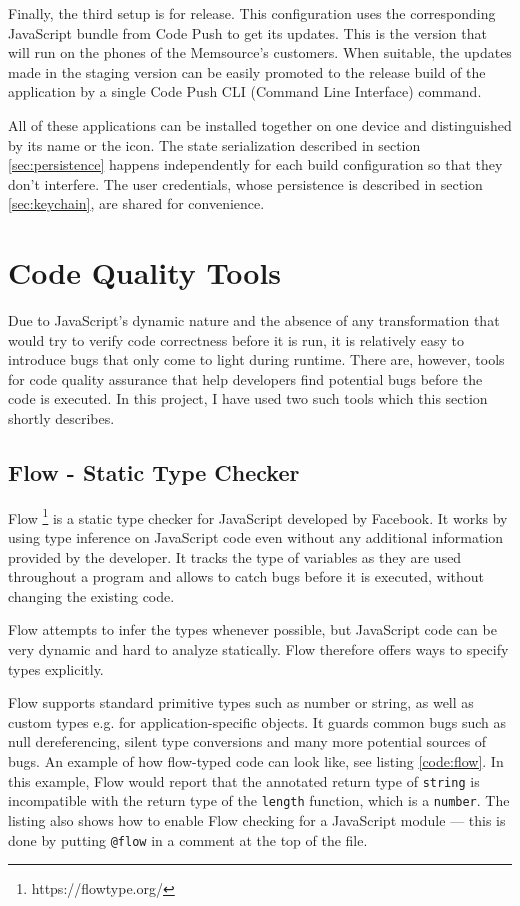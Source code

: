 Finally, the third setup is for release. This configuration uses the corresponding JavaScript bundle from Code Push to get its updates. This is the version that will run on the phones of the Memsource’s customers. When suitable, the updates made in the staging version can be easily promoted to the release build of the application by a single Code Push CLI (Command Line Interface) command.

All of these applications can be installed together on one device and distinguished by its name or the icon. The state serialization described in section \ref{sec:persistence} happens independently for each build configuration so that they don't interfere. The user credentials, whose persistence is described in section \ref{sec:keychain}, are shared for convenience.

\section{Code Quality Tools}

Due to JavaScript's dynamic nature and the absence of any transformation that would try to verify code correctness before it is run, it is relatively easy to introduce bugs that only come to light during runtime. There are, however, tools for code quality assurance that help developers find potential bugs before the code is executed. In this project, I have used two such tools which this section shortly describes.

\subsection{Flow - Static Type Checker}

Flow \footnote{https://flowtype.org/}   is a static type checker for JavaScript developed by Facebook. It works by using type inference on JavaScript code even without any additional information provided by the developer. It tracks the type of variables as they are used throughout a program and allows to catch bugs before it is executed, without changing the existing code. 

Flow attempts to infer the types whenever possible, but JavaScript code can be very dynamic and hard to analyze statically. Flow therefore offers ways to specify types explicitly.

Flow supports standard primitive types such as number or string, as well as custom types e.g. for application-specific objects. It guards common bugs such as null dereferencing, silent type conversions and many more potential sources of bugs. An example of how flow-typed code can look like, see listing \ref{code:flow}. In this example, Flow would report that the annotated return type of \texttt{string} is incompatible with the return type of the \texttt{length} function, which is a \texttt{number}. The listing also shows how to enable Flow checking for a JavaScript module --- this is done by putting \texttt{@flow} in a comment at the top of the file.


